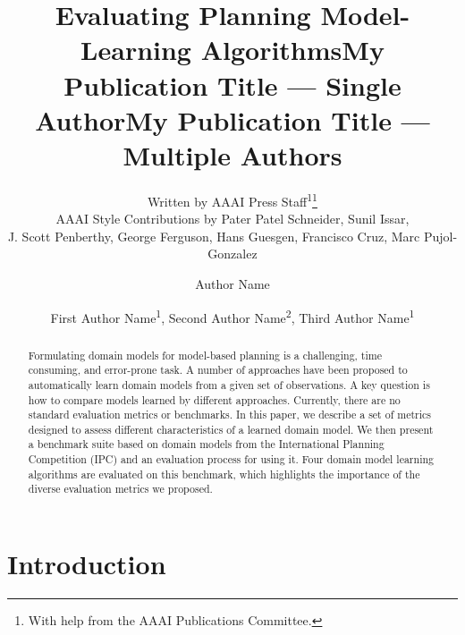 \documentclass[letterpaper]{article} %
\title{Evaluating Planning Model-Learning Algorithms}
\author{
    Written by AAAI Press Staff\textsuperscript{\rm 1}\thanks{With help from the AAAI Publications Committee.}\\
    AAAI Style Contributions by Pater Patel Schneider,
    Sunil Issar,\\
    J. Scott Penberthy,
    George Ferguson,
    Hans Guesgen,
    Francisco Cruz\equalcontrib,
    Marc Pujol-Gonzalez\equalcontrib
}
\title{My Publication Title --- Single Author}
\author {
    Author Name
}
\title{My Publication Title --- Multiple Authors}
\author {
    First Author Name\textsuperscript{\rm 1},
    Second Author Name\textsuperscript{\rm 2},
    Third Author Name\textsuperscript{\rm 1}
}
\newif\ifaddcomments
\newcommand{\roni}[1]{\ifaddcomments{\textcolor{red}{[Roni: #1]}}\fi}
\begin{document}
\maketitle

\begin{abstract}
Formulating domain models for model-based planning is a challenging, time consuming, and error-prone task. A number of approaches have been proposed to automatically learn domain models from a given set of observations. A key question is how to compare models learned by different approaches. 
Currently, there are no standard evaluation metrics or benchmarks. 
In this paper, we describe a set of metrics designed to assess different characteristics of a learned domain model. We then present a benchmark suite based on domain models from the International Planning Competition (IPC) and an evaluation process for using it.
Four domain model learning algorithms are evaluated on this benchmark, which highlights the importance of the diverse evaluation metrics we proposed. 
\end{abstract}





\section{Introduction}
\end{document}
